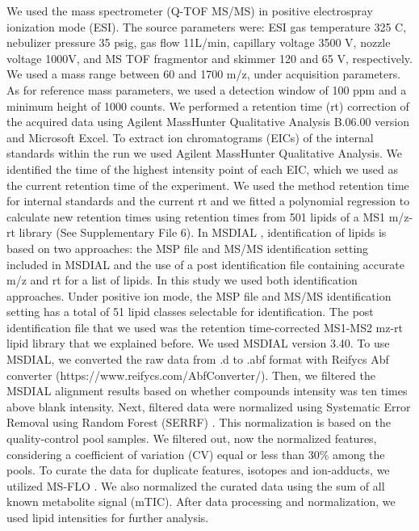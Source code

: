 \documentclass[9pt,twocolumn,twoside,lineno]{BioRxiv}
\begin{document}
We used the mass spectrometer (Q-TOF MS/MS) in positive electrospray ionization mode (ESI).
The source parameters were: ESI gas temperature 325 \degree C, nebulizer pressure 35 psig, gas flow 11L/min, capillary voltage 3500 V, nozzle voltage 1000V, and MS TOF fragmentor and skimmer 120 and 65 V, respectively.
We used a mass range between 60 and 1700 m/z, under acquisition parameters. 
As for reference mass parameters, we used a detection window of 100 ppm and a minimum height of 1000 counts. 
We performed a retention time (rt) correction of the acquired data using Agilent MassHunter Qualitative Analysis B.06.00 version and Microsoft Excel. 
To extract ion chromatograms (EICs) of the internal standards within the run we used Agilent MassHunter Qualitative Analysis.
We identified the time of the highest intensity point of each EIC, which we used as the current retention time of the experiment. 
We used the method retention time for internal standards and the current rt and we fitted a polynomial regression to calculate new retention times using retention times from 501 lipids of a MS1 m/z-rt library (See Supplementary File 6). 
In MSDIAL \cite{Tsugawa2015-kh}, identification of lipids is based on two approaches: the MSP file and MS/MS identification setting included in MSDIAL and the use of a post identification file containing accurate m/z and rt for a list of lipids. 
In this study we used both identification approaches. 
Under positive ion mode, the MSP file and MS/MS identification setting has a total of 51 lipid classes  selectable for identification. 
The post identification file that we used was the retention time-corrected MS1-MS2 mz-rt lipid library that we explained before. 
We used MSDIAL \cite{Tsugawa2015-kh} version 3.40. 
To use MSDIAL, we converted the raw data from .d to .abf format with Reifycs Abf converter (https://www.reifycs.com/AbfConverter/). 
Then, we filtered the MSDIAL alignment results based on whether compounds intensity was ten times above blank intensity. Next, filtered data were normalized using Systematic Error Removal using Random Forest (SERRF) \cite{Fan2019}. This normalization is based on the quality-control pool samples. 
We filtered out, now the normalized features, considering a coefficient of variation (CV) equal or less than 30\% among the pools. 
To curate the data for duplicate features, isotopes and ion-adducts, we utilized MS-FLO \cite{DeFelice2017-ms}.
We also normalized the curated data using the sum of all known metabolite signal (mTIC). 
After data processing and normalization, we used lipid intensities for further analysis.
\end{document}
